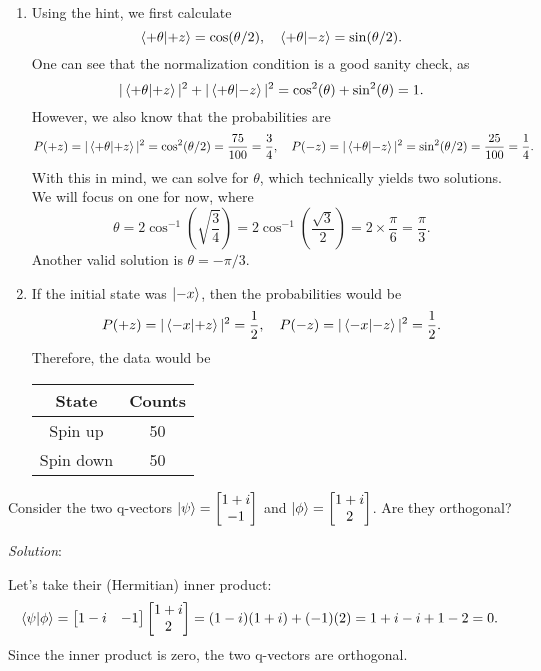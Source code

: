 \documentclass{article}
\begin{document}
\begin{enumerate}[label=\alph*)]
    \item Using the hint, we first calculate
    \[
    \braket{+\theta}{+z} = \cos(\theta / 2), \quad \braket{+\theta}{-z} = \sin(\theta / 2).
    \]
    One can see that the normalization condition is a good sanity check, as
    \[
    |\braket{+\theta}{+z}|^2 + |\braket{+\theta}{-z}|^2 = \cos^2(\theta) + \sin^2(\theta) = 1.
    \]
    However, we also know that the probabilities are
    \[
    P(+z) = |\braket{+\theta}{+z}|^2 = \cos^2(\theta / 2) = \frac{75}{100} = \frac{3}{4}, \quad P(-z) = |\braket{+\theta}{-z}|^2 = \sin^2(\theta / 2) = \frac{25}{100} = \frac{1}{4}.
    \]
    With this in mind, we can solve for $\theta$, which technically yields two solutions. We will focus on one for now, where 
    \[
    \theta = 2 \cos^{-1}\left(\sqrt{\frac{3}{4}}\right) = 2 \cos^{-1}\left(\frac{\sqrt{3}}{2}\right) = 2 \times \frac{\pi}{6} = \frac{\pi}{3}.
    \]
    Another valid solution is $\theta = -\pi / 3$.
    \item If the initial state was $\ket{-x}$, then the probabilities would be
    \[
    P(+z) = |\braket{-x}{+z}|^2 = \frac{1}{2}, \quad P(-z) = |\braket{-x}{-z}|^2 = \frac{1}{2}.
    \]
    Therefore, the data would be
    \begin{center}
    \begin{tabular}{|c|c|}
    \hline
    \textbf{State} & \textbf{Counts} \\
    \hline
    Spin up & 50 \\
    Spin down & 50 \\
    \hline
    \end{tabular}
    \end{center}
\end{enumerate}

\newpage

\begin{tcolorbox}[colframe=blue!50!black, arc=2mm, title=\textsc{Practice 3}]
    Consider the two q-vectors $\ket{\psi} = \begin{bmatrix} 1+i \\ -1 \end{bmatrix}$ and $\ket{\phi} = \begin{bmatrix} 1+i \\ 2 \end{bmatrix}$. Are they orthogonal?
\end{tcolorbox}

\textit{Solution}:

\vspace{1em}

Let's take their (Hermitian) inner product:
\[
\braket{\psi}{\phi} = \begin{bmatrix} 1-i & -1 \end{bmatrix} \begin{bmatrix} 1+i \\ 2 \end{bmatrix} = (1-i)(1+i) + (-1)(2) = 1 +i -i + 1 - 2 = 0.
\]
Since the inner product is zero, the two q-vectors are orthogonal.
\end{document}
